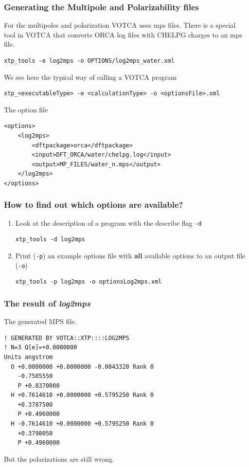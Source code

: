 \documentclass[t,aspectratio=169, 8pt]{beamer}
\begin{document}
\begin{frame}[fragile]
  \frametitle{Generating the Multipole and Polarizability files}
  For the multipoles and polarization VOTCA uses mps files. There is a special tool in VOTCA that converts ORCA log files with CHELPG charges to an mps file.  
  \begin{verbatim}
xtp_tools -e log2mps -o OPTIONS/log2mps_water.xml
  \end{verbatim}
  We see here the typical way of calling a VOTCA program
  \begin{verbatim}
xtp_<executableType> -e <calculationType> -o <optionsFile>.xml
  \end{verbatim}
  The option file
  \begin{verbatim}
<options>
    <log2mps>
        <dftpackage>orca</dftpackage>
        <input>DFT_ORCA/water/chelpg.log</input>
        <output>MP_FILES/water_n.mps</output>
    </log2mps>
</options>
  \end{verbatim}
\end{frame}

\begin{frame}[fragile]
  \frametitle{How to find out which options are available?}
  \begin{enumerate}
    \item Look at the description of a program with the describe flag \texttt{-d}\\
      \begin{verbatim}
xtp_tools -d log2mps
    \end{verbatim}
    \item Print (\texttt{-p}) an example options file with \textbf{all} available options to an output file (\texttt{-o})
    \begin{verbatim}
xtp_tools -p log2mps -o optionsLog2mps.xml
    \end{verbatim}
  \end{enumerate}
\end{frame}


\begin{frame}[fragile]
  \frametitle{The result of \textit{log2mps}}  
  The generated MPS file.
  \begin{verbatim}
! GENERATED BY VOTCA::XTP::::LOG2MPS 
! N=3 Q[e]=+0.0000000
Units angstrom
  O +0.0000000 +0.0000000 -0.0043320 Rank 0
    -0.7585550
    P +0.8370000
  H +0.7614610 +0.0000000 +0.5795250 Rank 0
    +0.3787500
    P +0.4960000
  H -0.7614610 +0.0000000 +0.5795250 Rank 0
    +0.3798050
    P +0.4960000
  \end{verbatim}
  But the polarizations are still wrong.
\end{frame}
\end{document}
